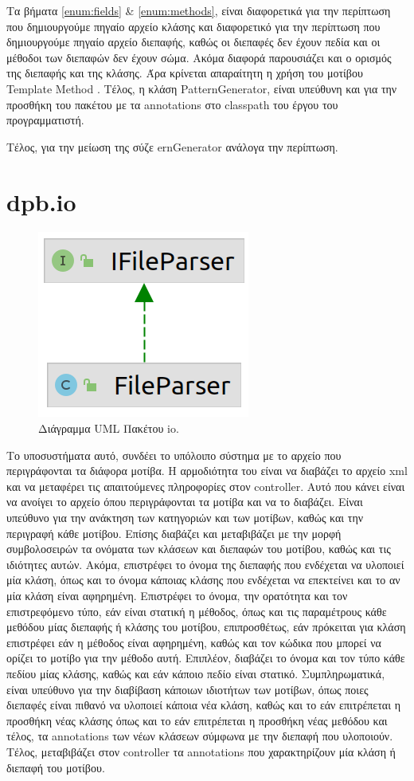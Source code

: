 \par
Τα βήματα \ref{enum:fields} \& \ref{enum:methods}, είναι διαφορετικά για την περίπτωση που δημιουργούμε πηγαίο αρχείο κλάσης 
και διαφορετικό για την περίπτωση που δημιουργούμε πηγαίο αρχείο διεπαφής, καθώς οι διεπαφές δεν έχουν πεδία 
και οι μέθοδοι των διεπαφών δεν έχουν σώμα. Ακόμα διαφορά παρουσιάζει και ο ορισμός της διεπαφής και της κλάσης. 
Άρα κρίνεται απαραίτητη η χρήση του μοτίβου Template Method \cite{GoF}. Τέλος, η κλάση PatternGenerator, 
είναι υπεύθυνη και για την προσθήκη του πακέτου με τα annotations στο classpath του έργου του προγραμματιστή.
\par
Τέλος, για την μείωση της σύζε
ernGenerator ανάλογα την περίπτωση.
\section{dpb.io}
\label{sec:dpb.io}
\begin{figure}[H]
    \centering
    \includegraphics[width=.25\textwidth]{Figures/io.png}
    \caption{Διάγραμμα UML Πακέτου io.}
    \label{fig:ioUML}
\end{figure}
\par
Το υποσυστήματα αυτό, συνδέει το υπόλοιπο σύστημα με το αρχείο που περιγράφονται τα διάφορα μοτίβα. 
Η αρμοδιότητα του είναι να διαβάζει το αρχείο xml και να μεταφέρει τις απαιτούμενες πληροφορίες στον controller. 
Αυτό που κάνει είναι να ανοίγει το αρχείο όπου περιγράφονται τα μοτίβα και να το διαβάζει. 
Είναι υπεύθυνο για την ανάκτηση των κατηγοριών και των μοτίβων, καθώς και την περιγραφή κάθε μοτίβου. 
Επίσης διαβάζει και μεταβιβάζει με την μορφή συμβολοσειρών τα ονόματα των κλάσεων και διεπαφών του μοτίβου, 
καθώς και τις ιδιότητες αυτών. Ακόμα, επιστρέφει το όνομα της διεπαφής που ενδέχεται να υλοποιεί μία κλάση, 
όπως και το όνομα κάποιας κλάσης που ενδέχεται να επεκτείνει και το αν μία κλάση είναι αφηρημένη. 
Επιστρέφει το όνομα, την ορατότητα και τον επιστρεφόμενο τύπο, εάν είναι στατική η μέθοδος, 
όπως και τις παραμέτρους κάθε μεθόδου μίας διεπαφής ή κλάσης του μοτίβου, επιπροσθέτως, εάν πρόκειται για κλάση επιστρέφει 
εάν η μέθοδος είναι αφηρημένη, καθώς και τον κώδικα που μπορεί να ορίζει το μοτίβο για την μέθοδο αυτή. Επιπλέον, 
διαβάζει το όνομα και τον τύπο κάθε πεδίου μίας κλάσης, καθώς και εάν κάποιο πεδίο είναι στατικό.
Συμπληρωματικά, είναι υπεύθυνο για την διαβίβαση κάποιων ιδιοτήτων των μοτίβων, όπως ποιες διεπαφές είναι πιθανό 
να υλοποιεί κάποια νέα κλάση, καθώς και το εάν επιτρέπεται η προσθήκη νέας κλάσης όπως και το εάν επιτρέπεται η προσθήκη νέας μεθόδου 
και τέλος, τα annotations των νέων κλάσεων σύμφωνα με την διεπαφή που υλοποιούν. 
Τέλος, μεταβιβάζει στον controller τα annotations που χαρακτηρίζουν μία κλάση ή διεπαφή του μοτίβου.
